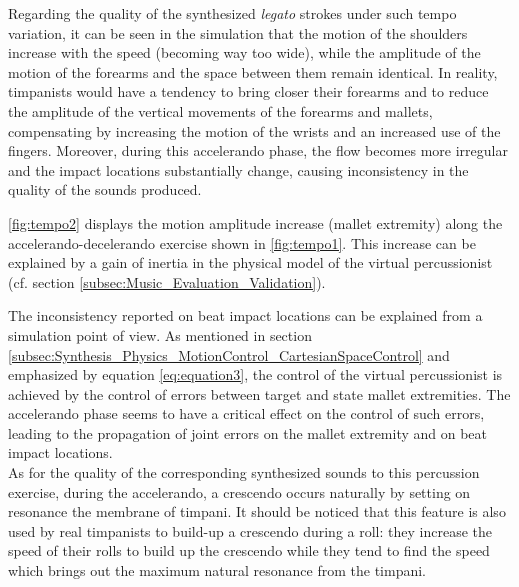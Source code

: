 Regarding the quality of the synthesized \emph{legato} strokes under such tempo variation, it can be seen in the simulation that the motion of the shoulders increase with the speed (becoming way too wide), while the amplitude of the motion of the forearms and the space between them remain identical. In reality, timpanists would have a tendency to bring closer their forearms and to reduce the amplitude of the vertical movements of the forearms and mallets, compensating by increasing the motion of the wrists and an increased use of the fingers. Moreover, during this accelerando phase, the flow becomes more irregular and the impact locations substantially change, causing inconsistency in the quality of the sounds produced. 


\myfigname \ref{fig:tempo2} displays the motion amplitude increase (mallet extremity) along the accelerando-decelerando exercise shown in \myfigname \ref{fig:tempo1}. This increase can be explained by a gain of inertia in the physical model of the virtual percussionist (cf. section \ref{subsec:Music_Evaluation_Validation}). %

The inconsistency reported on beat impact locations can be explained from a simulation point of view. As mentioned in section \ref{subsec:Synthesis_Physics_MotionControl_CartesianSpaceControl} and emphasized by equation \ref{eq:equation3}, the control of the virtual percussionist is achieved by the control of errors between target and state mallet extremities. The accelerando phase seems to have a critical effect on the control of such errors, leading to the propagation of joint errors on the mallet extremity and on beat impact locations.\\

As for the quality of the corresponding synthesized sounds to this percussion exercise, during the accelerando, a crescendo occurs naturally by setting on resonance the membrane of timpani. It should be noticed that this feature is also used by real timpanists to build-up a crescendo during a roll: they increase the speed of their rolls to build up the crescendo while they tend to find the speed which brings out the maximum natural resonance from the timpani.

